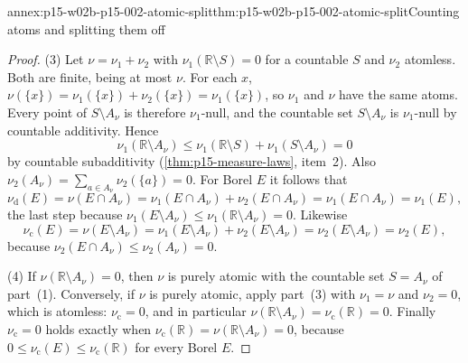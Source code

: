 \begin{annexitem}{annex:p15-w02b-p15-002-atomic-split}{thm:p15-w02b-p15-002-atomic-split}{Counting atoms and splitting them off}
\begin{proof}
(3) Let \(\nu=\nu_1+\nu_2\) with \(\nu_1(\mathbb R\setminus S)=0\) for a
countable \(S\) and \(\nu_2\) atomless. Both are finite, being at most
\(\nu\). For each \(x\),
\(\nu(\{x\})=\nu_1(\{x\})+\nu_2(\{x\})=\nu_1(\{x\})\), so \(\nu_1\) and
\(\nu\) have the same atoms. Every point of \(S\setminus A_\nu\) is
therefore \(\nu_1\)-null, and the countable set \(S\setminus A_\nu\) is
\(\nu_1\)-null by countable additivity. Hence
\[
 \nu_1(\mathbb R\setminus A_\nu)
   \leq\nu_1(\mathbb R\setminus S)+\nu_1(S\setminus A_\nu)=0
\]
by countable subadditivity (\cref{thm:p15-measure-laws}, item~2). Also
\(\nu_2(A_\nu)=\sum_{a\in A_\nu}\nu_2(\{a\})=0\). For Borel \(E\) it
follows that
\[
 \nu_{\mathrm d}(E)=\nu(E\cap A_\nu)
   =\nu_1(E\cap A_\nu)+\nu_2(E\cap A_\nu)=\nu_1(E\cap A_\nu)=\nu_1(E),
\]
the last step because
\(\nu_1(E\setminus A_\nu)\leq\nu_1(\mathbb R\setminus A_\nu)=0\).
Likewise
\[
 \nu_{\mathrm c}(E)=\nu(E\setminus A_\nu)
   =\nu_1(E\setminus A_\nu)+\nu_2(E\setminus A_\nu)
   =\nu_2(E\setminus A_\nu)=\nu_2(E),
\]
because \(\nu_2(E\cap A_\nu)\leq\nu_2(A_\nu)=0\).

(4) If \(\nu(\mathbb R\setminus A_\nu)=0\), then \(\nu\) is purely
atomic with the countable set \(S=A_\nu\) of part~(1). Conversely, if
\(\nu\) is purely atomic, apply part~(3) with \(\nu_1=\nu\) and
\(\nu_2=0\), which is atomless: \(\nu_{\mathrm c}=0\), and in particular
\(\nu(\mathbb R\setminus A_\nu)=\nu_{\mathrm c}(\mathbb R)=0\). Finally
\(\nu_{\mathrm c}=0\) holds exactly when
\(\nu_{\mathrm c}(\mathbb R)=\nu(\mathbb R\setminus A_\nu)=0\), because
\(0\leq\nu_{\mathrm c}(E)\leq\nu_{\mathrm c}(\mathbb R)\) for every
Borel \(E\).
\end{proof}
\end{annexitem}

